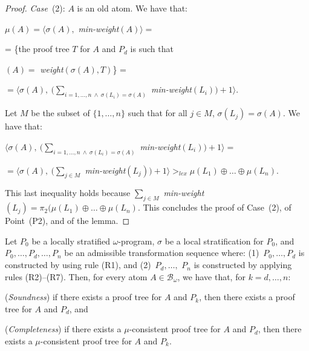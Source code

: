 \documentclass[english]{tlp}
\renewcommand{\mathit}{\displaystyle}
\begin{document}
\begin{proof}
\medskip
{\it{Case}}~(2): $A$ is an old atom. We have that:

\smallskip

\noindent 
$\mu(A)=\langle\sigma(A),$ {\it min-weight}$(A)\rangle =$ 

\smallskip
= \{the proof tree $T$  for $A$ and $P_d$ is such that

$(A) =$ {\it{weight}}$(\sigma(A), T)$\} =


\smallskip 
$=\langle\sigma(A),\ \big(\sum_{i=1,\ldots,n \ \wedge \ \sigma(L_i)=\sigma(A)}$ {\it min-weight}$(L_i)\big)+1\rangle$.
\smallskip

\noindent Let $M$ be the subset of $\{1,\ldots,n\}$ such that for all $j\in M$,
$\sigma(L_j)\!=\!\sigma(A)$. 
We have that: 

\smallskip

$\langle\sigma(A),\ \big(\sum_{i=1,\ldots,n \ \wedge \ \sigma(L_i)=\sigma(A)}$ {\it min-weight}$(L_i)\big)+1\rangle=$

\smallskip

$=\langle\sigma(A), \ \big(\sum_{j\in M}$ {\it min-weight}$(L_j)\big)+1\rangle
>_{\mathit{lex}}\mu(L_1)\oplus\ldots\oplus \mu(L_n)$.
 


\smallskip
\noindent
This last inequality holds because $\sum_{j\in M}$ {\it min-weight}$(L_j)=
\pi_2(\mu(L_1)\oplus\ldots\oplus \mu(L_n)$. This concludes the proof of Case~(2), of Point~(P2), and of the lemma.
\end{proof}

\begin{proposition} \label{prop:preserv-mu-consistency}
Let $P_0$ be a locally stratified $\omega$-program, $\sigma$ be a
local stratification for $P_0$, and \( P_{0},\ldots ,P_{d},\ldots
,P_{n} \) be an admissible transformation sequence where\/{\rm{:}} {\rm{(1)}}~\(
P_{0},\ldots ,P_{d} \) is constructed by using rule {\rm{(R1)}}, and
 {\rm{(2)}}~$P_{d},\ldots,$ $P_{n}$ is constructed by applying rules {\rm{(R2)}}--{\rm{(R7)}}.
Then, for every atom \( A \in \mathcal{B}_{\omega}\), we have that,
for $k=d,\ldots,n$\/{\rm{:}}

\smallskip

\noindent \textup{({\em Soundness})} if there exists a proof tree
for \( A \) and \( P_{k} \), then there exists a proof tree for \( A
\) and \( P_d\), and
\smallskip{}

\noindent \textup{({\em Completeness})} if there exists a \(\mu
\)-consistent proof tree for \( A \) and \( P_d\), then there exists
a \mbox{\( \mu\)-con\-sist}\-ent proof tree for \( A \) and \( P_{k}\).
\end{proposition}
\end{document}
